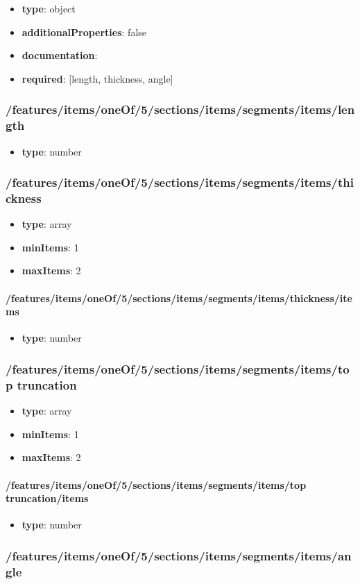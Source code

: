 \begin{itemize}\item {\bf type}: object
\item {\bf additionalProperties}: false
\item {\bf documentation}: 
\item {\bf required}: [length, thickness, angle]\end{itemize}
\subsubsection{/features/items/oneOf/5/sections/items/segments/items/length}
\begin{itemize}\item {\bf type}: number
\end{itemize}\subsubsection{/features/items/oneOf/5/sections/items/segments/items/thickness}
\begin{itemize}\item {\bf type}: array
\item {\bf minItems}: 1
\item {\bf maxItems}: 2
\end{itemize}\paragraph{/features/items/oneOf/5/sections/items/segments/items/thickness/items}
\begin{itemize}\item {\bf type}: number
\end{itemize}\subsubsection{/features/items/oneOf/5/sections/items/segments/items/top truncation}
\begin{itemize}\item {\bf type}: array
\item {\bf minItems}: 1
\item {\bf maxItems}: 2
\end{itemize}\paragraph{/features/items/oneOf/5/sections/items/segments/items/top truncation/items}
\begin{itemize}\item {\bf type}: number
\end{itemize}\subsubsection{/features/items/oneOf/5/sections/items/segments/items/angle}
